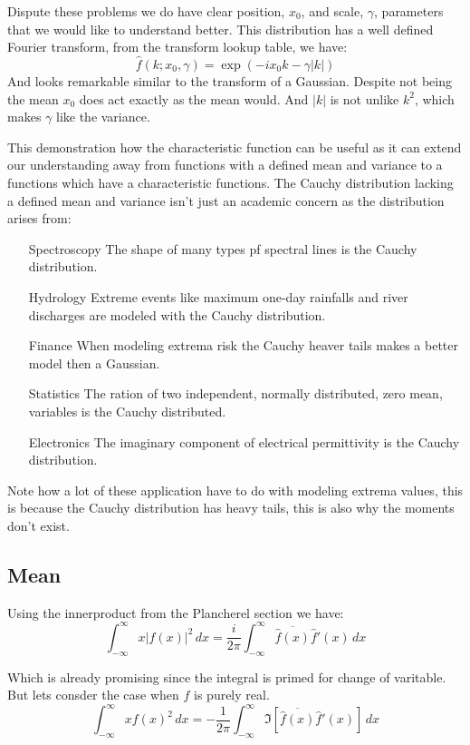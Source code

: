 \documentclass[12pt]{report}
\begin{document}
Dispute these problems we do have clear position, $x_0$, and scale, $\gamma$, parameters that we would like to understand better.
This distribution has a well defined Fourier transform, from the transform lookup table, we have:
\[\hat{f}(k;x_0,\gamma) = \exp(-ix_0k-\gamma|k|)\]
And looks remarkable similar to the transform of a Gaussian.
Despite not being the mean $x_0$ does act exactly as the mean would.
And $|k|$ is not unlike $k^2$, which makes $\gamma$ like the variance.

This demonstration how the characteristic function can be useful as it can extend our understanding away from functions with a defined mean and variance to a functions which have a characteristic functions.
The Cauchy distribution lacking a defined mean and variance isn't just an academic concern as the distribution arises from:
\begin{enumerate}
\item[Spectroscopy] The shape of many types pf spectral lines is the Cauchy distribution.
\item[Hydrology] Extreme events like maximum one-day rainfalls and river discharges are modeled with the Cauchy distribution.
\item[Finance] When modeling extrema risk the Cauchy heaver tails makes a better model then a Gaussian.
\item[Statistics] The ration of two independent, normally distributed, zero mean, variables is the Cauchy distributed.
\item[Electronics] The imaginary component of electrical permittivity is the Cauchy distribution.
\end{enumerate}

Note how a lot of these application have to do with modeling extrema values, this is because the Cauchy distribution has heavy tails, this is also why the moments don't exist.

\subsection{Mean}
Using the innerproduct from the Plancherel section we have:
\[\int_{-\infty}^{\infty}x|f(x)|^2\,dx = \frac{i}{2\pi}\int_{-\infty}^{\infty}\overline{\hat{f}(x)}\hat{f}'(x)\,dx\]

Which is already promising since the integral is primed for change of varitable.
But lets consder the case when $f$ is purely real.
\[\int_{-\infty}^{\infty}xf(x)^2\,dx = -\frac{1}{2\pi}\int_{-\infty}^{\infty}\Im[\overline{\hat{f}(x)}\hat{f}'(x)]\,dx\]
\end{document}
